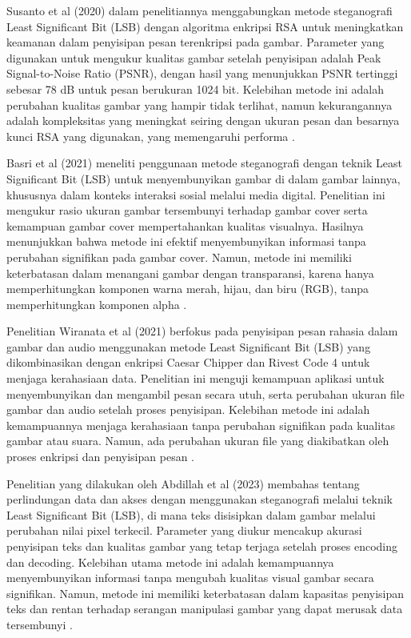 \documentclass{ittelkom}
\begin{document}
Susanto et al (2020) dalam penelitiannya menggabungkan metode steganografi
Least Significant Bit (LSB) dengan algoritma enkripsi RSA untuk meningkatkan
keamanan dalam penyisipan pesan terenkripsi pada gambar. Parameter yang
digunakan untuk mengukur kualitas gambar setelah penyisipan adalah Peak
Signal-to-Noise Ratio (PSNR), dengan hasil yang menunjukkan PSNR tertinggi
sebesar 78 dB untuk pesan berukuran 1024 bit. Kelebihan metode ini adalah
perubahan kualitas gambar yang hampir tidak terlihat, namun kekurangannya
adalah kompleksitas yang meningkat seiring dengan ukuran pesan dan besarnya
kunci RSA yang digunakan, yang memengaruhi performa
\cite{susanto2020kombinasi}.

Basri et al (2021) meneliti penggunaan metode steganografi dengan teknik Least
Significant Bit (LSB) untuk menyembunyikan gambar di dalam gambar lainnya,
khususnya dalam konteks interaksi sosial melalui media digital. Penelitian ini
mengukur rasio ukuran gambar tersembunyi terhadap gambar cover serta kemampuan
gambar cover mempertahankan kualitas visualnya. Hasilnya menunjukkan bahwa
metode ini efektif menyembunyikan informasi tanpa perubahan signifikan pada
gambar cover. Namun, metode ini memiliki keterbatasan dalam menangani gambar
dengan transparansi, karena hanya memperhitungkan komponen warna merah, hijau,
dan biru (RGB), tanpa memperhitungkan komponen alpha \cite{basri2021penerapan}.

Penelitian Wiranata et al (2021) berfokus pada penyisipan pesan rahasia dalam
gambar dan audio menggunakan metode Least Significant Bit (LSB) yang
dikombinasikan dengan enkripsi Caesar Chipper dan Rivest Code 4 untuk menjaga
kerahasiaan data. Penelitian ini menguji kemampuan aplikasi untuk
menyembunyikan dan mengambil pesan secara utuh, serta perubahan ukuran file
gambar dan audio setelah proses penyisipan. Kelebihan metode ini adalah
kemampuannya menjaga kerahasiaan tanpa perubahan signifikan pada kualitas
gambar atau suara. Namun, ada perubahan ukuran file yang diakibatkan oleh
proses enkripsi dan penyisipan pesan \cite{wiranata2021aplikasi}.

Penelitian yang dilakukan oleh Abdillah et al (2023) membahas tentang
perlindungan data dan akses dengan menggunakan steganografi melalui teknik
Least Significant Bit (LSB), di mana teks disisipkan dalam gambar melalui
perubahan nilai pixel terkecil. Parameter yang diukur mencakup akurasi
penyisipan teks dan kualitas gambar yang tetap terjaga setelah proses encoding
dan decoding. Kelebihan utama metode ini adalah kemampuannya menyembunyikan
informasi tanpa mengubah kualitas visual gambar secara signifikan. Namun,
metode ini memiliki keterbatasan dalam kapasitas penyisipan teks dan rentan
terhadap serangan manipulasi gambar yang dapat merusak data tersembunyi
\cite{abdillah2023implementasi}.
\end{document}
